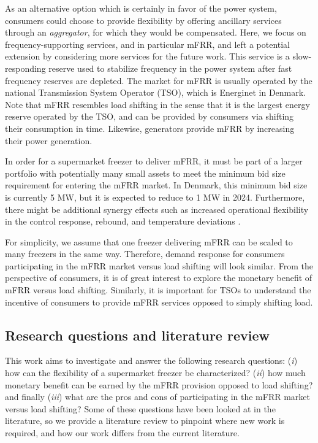 \documentclass[11pt,a4paper]{article}
\begin{document}
As an alternative option which is certainly in favor of the power system, consumers could choose to provide flexibility by offering ancillary services through an \textit{aggregator}, for which they would be compensated. Here, we focus on frequency-supporting services, and in particular mFRR, and left a potential extension by considering more services for the future work. This service is a slow-responding reserve used to stabilize frequency in the power system after fast frequency reserves are depleted. The market for mFRR is usually operated by the national Transmission System Operator (TSO), which is Energinet in Denmark. Note that mFRR resembles load shifting in the sense that it is the largest energy reserve operated by the TSO, and can be provided by consumers via shifting their consumption in time. Likewise, generators provide mFRR by increasing their power generation.

In order for a supermarket freezer to deliver mFRR, it must be part of a larger portfolio with potentially many small assets to meet the minimum bid size requirement for entering the mFRR market. In Denmark, this minimum bid size is currently 5 MW, but it is expected to reduce to 1 MW in 2024. Furthermore, there might be additional synergy effects such as increased operational flexibility in the control response, rebound, and temperature deviations \cite{koch2011modeling}.

For simplicity, we assume that one freezer delivering mFRR can be scaled to many freezers in the same way. Therefore,
demand response for consumers participating in the mFRR market versus load shifting will  look similar. From the perspective of consumers, it is of great interest to explore the monetary benefit of mFRR versus load shifting. Similarly, it is important for TSOs to understand the incentive of consumers to provide mFRR services opposed to simply shifting load.

\subsection{Research questions and literature review}
%
This work aims to investigate and answer the following research questions: (\textit{i}) how can the flexibility of a supermarket freezer be characterized? (\textit{ii}) how much monetary benefit can be earned by the mFRR provision opposed to load shifting? and finally (\textit{iii})
what are the pros and cons of participating in the mFRR market versus load shifting? Some of these questions have been  looked at  in the literature, so we provide a  literature review to pinpoint where new work is required, and how our work differs from the current literature.
\end{document}
